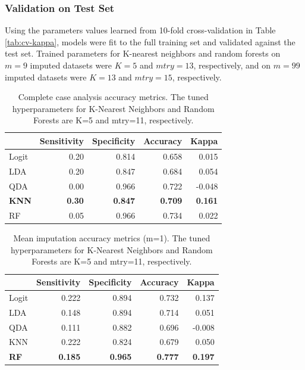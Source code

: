 \documentclass[12pt,]{article}
\begin{document}
\subsubsection{Validation on Test Set}\label{validation-on-test-set}

Using the parameters values learned from 10-fold cross-validation in
Table \ref{tab:cv-kappa}, models were fit to the full training set and
validated against the test set. Trained parameters for K-nearest
neighbors and random forests on \(m=9\) imputed datasets were \(K=5\)
and \(mtry=13\), respectively, and on \(m=99\) imputed datasets were
\(K=13\) and \(mtry=15\), respectively.

\begin{table}[!h]

\caption{\label{tab:unnamed-chunk-6}\label{tab:cc-metrics} Complete case analysis accuracy metrics.  The tuned hyperparameters for K-Nearest Neighbors and Random Forests are K=5 and mtry=11, respectively.}
\centering
\fontsize{10}{12}\selectfont
\begin{tabular}{lrrrr}
\toprule
  & Sensitivity & Specificity & Accuracy & Kappa\\
\midrule
Logit & 0.20 & 0.814 & 0.658 & 0.015\\
LDA & 0.20 & 0.847 & 0.684 & 0.054\\
QDA & 0.00 & 0.966 & 0.722 & -0.048\\
\textbf{KNN} & \textbf{0.30} & \textbf{0.847} & \textbf{0.709} & \textbf{0.161}\\
RF & 0.05 & 0.966 & 0.734 & 0.022\\
\bottomrule
\end{tabular}
\end{table}

\begin{table}[!h]

\caption{\label{tab:unnamed-chunk-7}\label{tab:mean-metrics} Mean imputation accuracy metrics (m=1).  The tuned hyperparameters for K-Nearest Neighbors and Random Forests are K=5 and mtry=11, respectively.}
\centering
\fontsize{10}{12}\selectfont
\begin{tabular}{lrrrr}
\toprule
  & Sensitivity & Specificity & Accuracy & Kappa\\
\midrule
Logit & 0.222 & 0.894 & 0.732 & 0.137\\
LDA & 0.148 & 0.894 & 0.714 & 0.051\\
QDA & 0.111 & 0.882 & 0.696 & -0.008\\
KNN & 0.222 & 0.824 & 0.679 & 0.050\\
\textbf{RF} & \textbf{0.185} & \textbf{0.965} & \textbf{0.777} & \textbf{0.197}\\
\bottomrule
\end{tabular}
\end{table}
\end{document}
